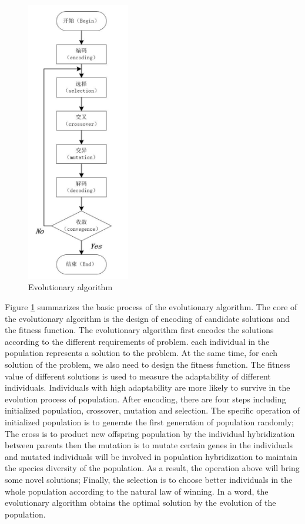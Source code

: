 \begin{figure}[!ht]
  \centering
  \includegraphics[width=0.4\textwidth]{figures/ea_flow.jpg}
  \caption{Evolutionary algorithm}
  \label{fig:evflow}
\end{figure}


Figure \ref{fig:evflow} summarizes the basic process of the evolutionary algorithm. The core 
of the evolutionary algorithm is the design of encoding of candidate 
solutions and the fitness function. The evolutionary algorithm first encodes 
the solutions according to the different requirements of problem. each 
individual in the population represents a solution to the problem. At the 
same time, for each solution of the problem, we also need to design the 
fitness function. The fitness value of different solutions is used to measure 
the adaptability of different individuals. Individuals with high adaptability 
are more likely to survive in the evolution process of population. After 
encoding, there are four steps including initialized population, crossover, 
mutation and selection. The specific operation of initialized population is 
to generate the first generation of population randomly; The cross is to 
product new offspring population by the individual hybridization between 
parents then the mutation is to mutate certain genes in the individuals and 
mutated individuals will be involved in population hybridization to maintain 
the species diversity of the population. As a result, the operation above 
will bring some novel solutions; Finally, the selection is to choose better 
individuals in the whole population according to the natural law of winning. 
In a word, the evolutionary algorithm obtains the optimal solution by the 
evolution of the population.



